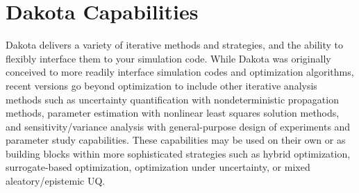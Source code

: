 \section{Dakota Capabilities}\label{intro:capabilities}

Dakota delivers a variety of iterative methods and strategies, and the
ability to flexibly interface them to your simulation code.  While
Dakota was originally conceived to more readily interface simulation
codes and optimization algorithms, recent versions go beyond
optimization to include other iterative analysis methods such as
uncertainty quantification with nondeterministic propagation methods,
parameter estimation with nonlinear least squares solution methods,
and sensitivity/variance analysis with general-purpose design of
experiments and parameter study capabilities. These capabilities may
be used on their own or as building blocks within more sophisticated
strategies such as hybrid optimization, surrogate-based optimization,
optimization under uncertainty, or mixed aleatory/epistemic UQ.  

